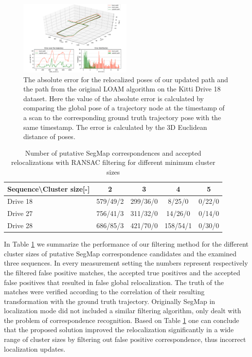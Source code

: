 \documentclass[letterpaper, 10 pt, conference]{ieeeconf}  %
\begin{document}
\begin{figure}[!t]
\centerline{\includegraphics[width=0.5\textwidth]{figures/full_evaluate_18.png}}\par
\caption{The absolute error for the relocalized poses of our updated path and the path from the original LOAM algorithm on the Kitti Drive 18 dataset. Here the value of the absolute error is calculated by comparing the global pose of a trajectory node at the timestamp of a scan to the corresponding ground truth trajectory pose with the same timestamp. The error is calculated by the 3D Euclidean distance of poses.}
\label{fig:abs_error}
\end{figure}


\begin{table}[!t]
\centering
\caption{Number of putative SegMap correspondences and accepted relocalizations with RANSAC filtering for different minimum cluster sizes}
\begin{tabular}{|l|c|c|c|c|}
\hline
Sequence\textbackslash Cluster size[-] & 2 & 3 & 4 & 5\\
\hline
Drive 18 & 579/49/2 &299/36/0 & 8/25/0 &0/22/0\\
Drive 27& 756/41/3 & 311/32/0 & 14/26/0 & 0/14/0\\
Drive 28 & 686/85/3& 421/70/0 & 158/54/1 &0/30/0\\
\hline
\end{tabular}
\label{tab:ransac_table}
\end{table}

In Table \ref{tab:ransac_table} we summarize the performance of our filtering method for the different cluster sizes of putative SegMap correspondence candidates and the examined three sequences. In every measurement setting the numbers represent respectively the filtered false positive matches, the accepted true positives and the accepted false positives that resulted in false global relocalization. The truth of the matches were verified according to the correlation of their resulting transformation with the ground truth trajectory. Originally SegMap in localization mode did not included a similar filtering algorithm, only dealt with the problem of correspondence recognition. Based on Table \ref{tab:ransac_table} one can conclude that the proposed solution improved the relocalization significantly in a wide range of cluster sizes by filtering out false positive correspondence, thus incorrect localization updates.
\end{document}

